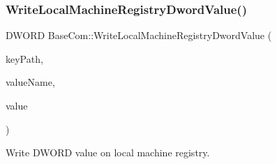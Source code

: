 \subsubsection{\texorpdfstring{Write\+Local\+Machine\+Registry\+Dword\+Value()}{WriteLocalMachineRegistryDwordValue()}}
{\footnotesize\ttfamily D\+W\+O\+RD Base\+Com\+::\+Write\+Local\+Machine\+Registry\+Dword\+Value (\begin{DoxyParamCaption}\item[{B\+S\+TR}]{key\+Path,  }\item[{B\+S\+TR}]{value\+Name,  }\item[{D\+W\+O\+RD}]{value }\end{DoxyParamCaption})\hspace{0.3cm}{\ttfamily [static]}}



Write D\+W\+O\+RD value on local machine registry. 


